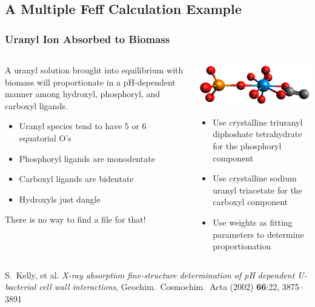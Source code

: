 \documentclass[10pt, xcolor=x11names, compress]{beamer}
\begin{document}
\subsection[Example]{A Multiple Feff Calculation Example}
\begin{frame}
  \frametitle{Uranyl Ion Absorbed to Biomass}

  \begin{columns}[T]
    \begin{column}{0.5\linewidth}
      A uranyl solution brought into equilibrium with biomass will
      proportionate in a pH-dependent manner among hydroxyl,
      phosphoryl, and carboxyl ligands.
      \begin{itemize}
      \item Uranyl species tend to have 5 or 6 equatorial O's
      \item Phosphoryl ligands are monodentate
      \item Carboxyl ligands are bidentate
      \item Hydroxyls just dangle
      \end{itemize}
      \begin{alertblock}{}
        There is no way to find a  file for that!
      \end{alertblock}
    \end{column}
    \begin{column}{0.5\linewidth}
      \quad\includegraphics[width=0.8\linewidth]{mfc/uranyl.png}
      \begin{itemize}
      \item Use crystalline triuranyl diphoshate tetrahydrate for the
        phosphoryl component
      \item Use crystalline sodium uranyl triacetate for the carboxyl
        component 
      \item Use weights as fitting parameters to determine proportionation
      \end{itemize}
    \end{column}
  \end{columns}


  \begin{flushright}
    \begin{minipage}{0.5\linewidth}
      \tiny
      S.\ Kelly, et al. \textit{X-ray absorption fine-structure
        determination of pH dependent U-bacterial cell wall
        interactions}, Geochim.\ Cosmochim.\ Acta (2002)
      \textbf{66}:22, 3875--3891
    \end{minipage}
  \end{flushright}
\end{frame}
\end{document}
